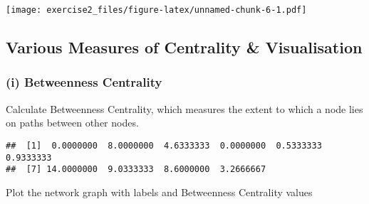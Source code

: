\documentclass[
]{article}
\newenvironment{Shaded}{\begin{snugshade}}{\end{snugshade}}
\newcommand{\AttributeTok}[1]{\textcolor[rgb]{0.77,0.63,0.00}{#1}}
\newcommand{\DecValTok}[1]{\textcolor[rgb]{0.00,0.00,0.81}{#1}}
\newcommand{\FloatTok}[1]{\textcolor[rgb]{0.00,0.00,0.81}{#1}}
\newcommand{\FunctionTok}[1]{\textcolor[rgb]{0.00,0.00,0.00}{#1}}
\newcommand{\NormalTok}[1]{#1}
\newcommand{\OtherTok}[1]{\textcolor[rgb]{0.56,0.35,0.01}{#1}}
\newcommand{\SpecialCharTok}[1]{\textcolor[rgb]{0.00,0.00,0.00}{#1}}
\newcommand{\StringTok}[1]{\textcolor[rgb]{0.31,0.60,0.02}{#1}}
\begin{document}
\texttt{[image: exercise2\_files/figure-latex/unnamed-chunk-6-1.pdf]}

\hypertarget{various-measures-of-centrality-visualisation}{%
\subsection{Various Measures of Centrality \&
Visualisation}\label{various-measures-of-centrality-visualisation}}

\hypertarget{i-betweenness-centrality}{%
\subsubsection{(i) Betweenness
Centrality}\label{i-betweenness-centrality}}

Calculate Betweenness Centrality, which measures the extent to which a
node lies on paths between other nodes.

\begin{Shaded}
\end{Shaded}

\begin{verbatim}
##  [1]  0.0000000  8.0000000  4.6333333  0.0000000  0.5333333  0.9333333
##  [7] 14.0000000  9.0333333  8.6000000  3.2666667
\end{verbatim}

Plot the network graph with labels and Betweenness Centrality values

\begin{Shaded}
\end{Shaded}
\end{document}
